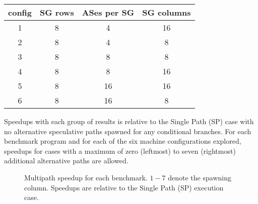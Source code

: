 \documentclass[10pt,dvips]{article}
\begin{document}
\begin{tabular}{|c|c|c|c|}
\hline 
config&
SG rows&
ASes per SG&
SG columns\\
\hline
\hline 
1&
8&
4&
16\\
\hline 
2&
8&
4&
8\\
\hline 
3&
8&
8&
8\\
\hline 
4&
8&
8&
16\\
\hline 
5&
8&
16&
16\\
\hline 
6&
8&
16&
8\\
\hline
\end{tabular}

Speedups with each group of results is relative to the
Single Path (SP) case with no alternative speculative paths spawned
for any conditional branches.  For each benchmark program and
for each of the six machine configurations explored, speedups
for cases with a maximum
of zero (leftmost) to seven (rightmost) additional alternative 
paths are allowed.

\begin{figure}
\vspace{0.2 in}
\setlength{\epsfxsize}{14cm}%
\centerline{}
\caption{ Multipath speedup for each benchmark.  $1-7$ denote the
spawning column. 
Speedups are relative to the Single Path (SP) execution case.}
\label{figall}
\end{figure}



\end{document}
